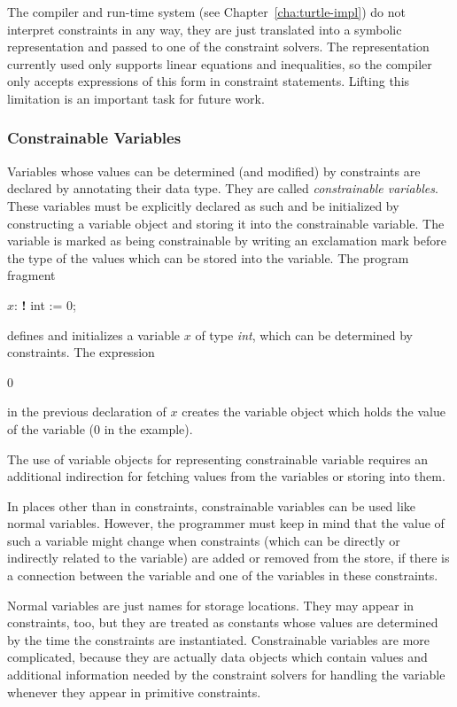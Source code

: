 The \turtle{} compiler and run-time system (see
Chapter~\ref{cha:turtle-impl}) do not interpret constraints in any
way, they are just translated into a symbolic representation and
passed to one of the constraint solvers.  The representation currently
used only supports linear equations and inequalities, so the compiler
only accepts expressions of this form in constraint statements.
Lifting this limitation is an important task for future work.

\subsubsection{Constrainable Variables}

%
Variables whose values can be determined (and modified) by constraints
are declared by annotating their data type.  They are called {\em
  constrainable variables}.  These variables must be explicitly
declared as such and be initialized by constructing a variable object
and storing it into the constrainable variable.  The variable is
marked as being constrainable by writing an exclamation mark before
the type of the values which can be stored into the variable.  The
program fragment
%
\begin{ttlprog}
 $x$: {\bf!} int := \ttlVar{} 0;
\end{ttlprog}
%
defines and initializes a variable $x$ of type {\em int}, which can be
determined by constraints.  The expression
%
\begin{ttlprog}
\>\ttlVar{} 0
\end{ttlprog}
%
in the previous declaration of $x$ creates the variable object which
holds the value of the variable (0 in the example).

The use of variable objects for representing constrainable variable
requires an additional indirection for fetching values from the
variables or storing into them.

In places other than in constraints, constrainable variables can be
used like normal variables.  However, the programmer must keep in mind
that the value of such a variable might change when constraints (which
can be directly or indirectly related to the variable) are added or
removed from the store, if there is a connection between the variable
and one of the variables in these constraints.

Normal variables are just names for storage locations.  They may
appear in constraints, too, but they are treated as constants whose
values are determined by the time the constraints are instantiated.
Constrainable variables are more complicated, because they are
actually data objects which contain values and additional information
needed by the constraint solvers for handling the variable whenever
they appear in primitive constraints.

